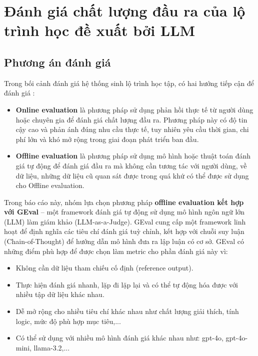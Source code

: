 
\section{Đánh giá chất lượng đầu ra của lộ trình học đề xuất bởi LLM}

\subsection{Phương án đánh giá}
Trong bối cảnh đánh giá hệ thống sinh lộ trình học tập, có hai hướng tiếp cận để đánh giá \cite{zhang2020new}:
\begin{itemize}
    \item \textbf{Online evaluation} là phương pháp sử dụng phản hồi thực tế từ người dùng hoặc chuyên gia để đánh giá chất lượng đầu ra. Phương pháp này có độ tin cậy cao và phản ánh đúng nhu cầu thực tế, tuy nhiên yêu cầu thời gian, chi phí lớn và khó mở rộng trong giai đoạn phát triển ban đầu.
    \item \textbf{Offline evaluation} là phương pháp sử dụng mô hình hoặc thuật toán đánh giá tự động để đánh giá đầu ra mà không cần tương tác với người dùng, về dữ liệu, những dữ liệu cũ quan sát được trong quá khứ có thể được sử dụng cho Offline evaluation.
\end{itemize}
Trong báo cáo này, nhóm lựa chọn phương pháp \textbf{offline evaluation kết hợp với GEval} – một framework đánh giá tự động sử dụng mô hình ngôn ngữ lớn (LLM) làm giám khảo (LLM-as-a-Judge)\cite{liu2023gevalnlgevaluationusing}. GEval cung cấp một framework linh hoạt để định nghĩa các tiêu chí đánh giá tuỳ chỉnh, kết hợp với chuỗi suy luận (Chain-of-Thought) để hướng dẫn mô hình đưa ra lập luận có cơ sở. GEval có những điểm phù hợp để được chọn làm metric cho  phần đánh giá này vì:
\begin{itemize}
    \item Không cần dữ liệu tham chiếu cố định (reference output).
    \item Thực hiện đánh giá nhanh, lặp đi lặp lại và có thể tự động hóa được với nhiều tập dữ liệu khác nhau.
    \item Dễ mở rộng cho nhiều tiêu chí khác nhau như chất lượng giải thích, tính logic, mức độ phù hợp mục tiêu,...
    \item Có thể sử dụng với nhiều mô hình đánh giá khác nhau như: gpt-4o, gpt-4o-mini, llama-3.2,...
\end{itemize}

